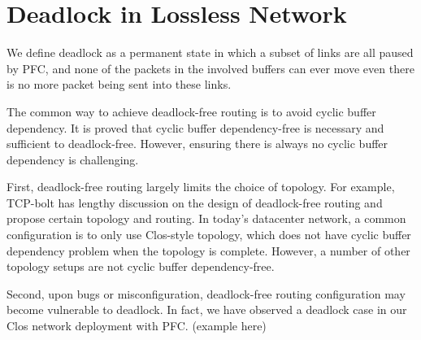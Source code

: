 \section{Deadlock in Lossless Network}



We define deadlock as a permanent state in which a subset of links are all paused
by PFC, and none of the packets in the involved buffers can ever move even there is 
no more packet being sent into these links.

The common way to achieve deadlock-free routing is to avoid cyclic buffer dependency.
It is proved that cyclic buffer dependency-free is necessary and sufficient to deadlock-free.
However, ensuring there is always no cyclic buffer dependency is challenging.

First, deadlock-free routing largely limits the choice of topology. For example, TCP-bolt 
has lengthy discussion on the design of deadlock-free routing and propose certain topology and routing. 
In today's datacenter network, a common configuration is to only use Clos-style topology, which does 
not have cyclic buffer dependency problem when the topology is complete. However, a number
of other topology setups are not cyclic buffer dependency-free.


Second, upon bugs or misconfiguration, deadlock-free routing configuration may become
vulnerable to deadlock. In fact, we have observed a deadlock case in our Clos network
deployment with PFC. (example here)


